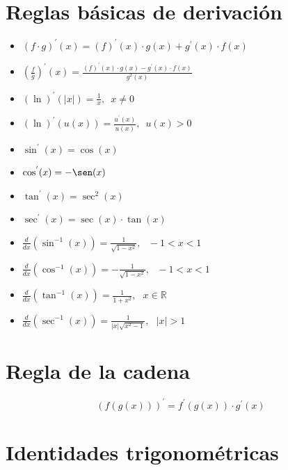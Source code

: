 \documentclass[twoside,landscape,letterpaper,twocolumn,13pt]{book}
\begin{document}
\pagestyle{empty} %

\section*{Reglas básicas de derivación}

\begin{itemize}
    \item $(f\cdot g)^{'}(x)  = (f)^{'}(x) \cdot g(x) + g^{'}(x)  \cdot f(x)   $
    \item $\displaystyle{\left( \frac{f}{g} \right)}^{'}(x) =\displaystyle{\frac{ (f)^{'}(x) \cdot g(x) - g^{'}(x)  \cdot f(x)}{g^{2}(x)}}$
    \item $(\ln)^{'}(|x|) = \displaystyle{\frac{1}{x}}, \,\,\, x \not= 0 $
    \item $(\ln)^{'}(u(x)) = \displaystyle{\frac{u^{'}(x)}{u(x)}}, \,\,\, u(x) > 0 $
    \item $\sin^{'}(x) = \cos(x)$
    \item $\cos^{'}(x) = -\sen(x)$
    \item $\tan^{'}(x) = \sec^{2}(x)$
    \item $\sec^{'}(x) = \sec(x) \cdot \tan(x)$
    \item $\displaystyle{\frac{d}{dx}(\sin^{-1}(x))}= \displaystyle{\frac{1}{\sqrt{1-x^{2}}}, \,\,\,\, -1 <  x < 1 }$
    \item $\displaystyle{\frac{d}{dx}(\cos^{-1}(x))}= \displaystyle{- \frac{1}{\sqrt{1-x^{2}}}, \,\,\,\, -1 <  x < 1 }$

    \item $\displaystyle{\frac{d}{dx}(\tan^{-1}(x))} = \displaystyle{\frac{1}{1+x^{2}}, \,\,\,\, x \in \mathbb{R}}$
    
    \item $\displaystyle{\frac{d}{dx}(\sec^{-1}(x))} = \displaystyle{\frac{1}{|x| \sqrt{x^{2} - 1}}, \,\,\,\, |x| > 1}$
    
\end{itemize}

\section*{Regla de la cadena}
\begin{equation*}
(f(g(x)))^{'} =\displaystyle{ f^{'}(g(x)) \cdot g^{'}(x)}
\end{equation*}


\section*{Identidades trigonométricas}
\end{document}
